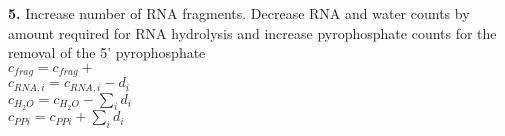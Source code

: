\documentclass[12pt]{article}
\begin{document}
{
\setlength{\interspacetitleruled}{0pt}
\setlength{\algotitleheightrule}{0pt}
\begin{algorithm}[H]
\SetNoFillComment
\textbf{5.} Increase number of RNA fragments. Decrease RNA and water counts by amount required for RNA hydrolysis and increase pyrophosphate counts for the removal of the 5' pyrophosphate\\
    \-\hspace{1cm} $c_{frag} = c_{frag} +$ \\
    \-\hspace{1cm} $c_{RNA,i} = c_{RNA,i} - d_{i}$\\
    \-\hspace{1cm} $c_{H_2O} = c_{H_2O} - \sum\limits_i d_i$\\
    \-\hspace{1cm} $c_{PPi} = c_{PPi} + \sum\limits_i d_i$\\


\end{algorithm}}
\end{document}
